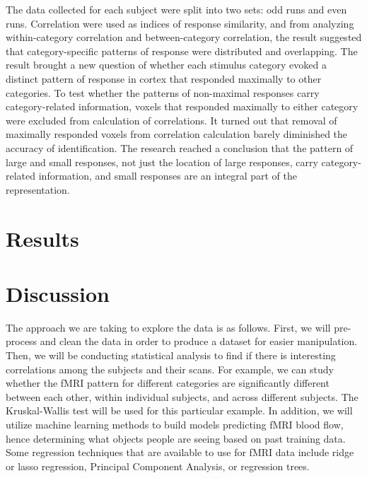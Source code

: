 \documentclass[11pt]{article}
\begin{document}
The data collected for each subject were split into two sets: odd runs and even 
runs. Correlation were used as indices of response similarity, and from 
analyzing within-category correlation and between-category correlation, the 
result suggested that category-specific patterns of response were distributed 
and overlapping. The result brought a new question of whether each stimulus 
category evoked a distinct pattern of response in cortex that responded 
maximally to other categories. To test whether the patterns of non-maximal 
responses carry category-related information, voxels that responded maximally 
to either category were excluded from calculation of correlations. It turned 
out that removal of maximally responded voxels from correlation calculation 
barely diminished the accuracy of identification. The research reached a 
conclusion that the pattern of large and small responses, not just the location 
of large responses, carry category-related information, and small responses 
are an integral part of the representation.\\

\section{Results}



\section{Discussion}

The approach we are taking to explore the data is as follows. First, we will
pre-process and clean the data in order to produce a dataset for easier
manipulation. Then, we will be conducting statistical analysis to find if there
is interesting correlations among the subjects and their scans. For example,
we can study whether the fMRI pattern for different categories are
significantly different between each other, within individual subjects, and
across different subjects. The Kruskal-Wallis test will be used for this
particular example. In addition, we will utilize machine learning methods to
build models predicting fMRI blood flow, hence determining what objects people
are seeing based on past training data. Some regression techniques that are
available to use for fMRI data include ridge or lasso regression, Principal
Component Analysis, or regression trees.\\


\end{document}
